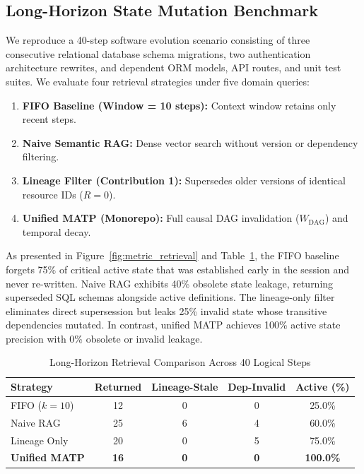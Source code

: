 \documentclass[10pt,journal,compsoc]{IEEEtran}
\begin{document}
\subsection{Long-Horizon State Mutation Benchmark}
We reproduce a 40-step software evolution scenario consisting of three consecutive relational database schema migrations, two authentication architecture rewrites, and dependent ORM models, API routes, and unit test suites. We evaluate four retrieval strategies under five domain queries:
\begin{enumerate}
    \item \textbf{FIFO Baseline (Window = 10 steps):} Context window retains only recent steps.
    \item \textbf{Naive Semantic RAG:} Dense vector search without version or dependency filtering.
    \item \textbf{Lineage Filter (Contribution 1):} Supersedes older versions of identical resource IDs ($R=0$).
    \item \textbf{Unified MATP (Monorepo):} Full causal DAG invalidation ($W_{\text{DAG}}$) and temporal decay.
\end{enumerate}

As presented in Figure~\ref{fig:metric_retrieval} and Table~\ref{tab:long_horizon}, the FIFO baseline forgets 75\% of critical active state that was established early in the session and never re-written. Naive RAG exhibits 40\% obsolete state leakage, returning superseded SQL schemas alongside active definitions. The lineage-only filter eliminates direct supersession but leaks 25\% invalid state whose transitive dependencies mutated. In contrast, unified MATP achieves 100\% active state precision with 0\% obsolete or invalid leakage.

\begin{table}[!t]
\caption{Long-Horizon Retrieval Comparison Across 40 Logical Steps}
\label{tab:long_horizon}
\centering
\setlength{\tabcolsep}{2.6pt}
\begin{tabular}{lcccc}
\toprule
\textbf{Strategy} & \textbf{Returned} & \textbf{Lineage-Stale} & \textbf{Dep-Invalid} & \textbf{Active (\%)} \\
\midrule
FIFO ($k=10$) & 12 & 0 & 0 & 25.0\% \\
Naive RAG & 25 & 6 & 4 & 60.0\% \\
Lineage Only & 20 & 0 & 5 & 75.0\% \\
\textbf{Unified MATP} & \textbf{16} & \textbf{0} & \textbf{0} & \textbf{100.0\%} \\
\bottomrule
\end{tabular}
\end{table}
\end{document}
